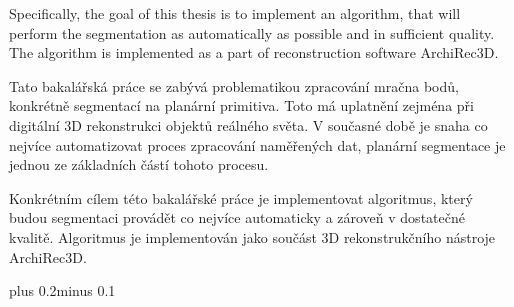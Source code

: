 \documentclass[11pt,twoside,a4paper]{book}
\begin{document}
Specifically, the goal of this thesis is to implement an algorithm, that will perform the segmentation as automatically as possible and in sufficient quality. The algorithm is implemented as a part of reconstruction software ArchiRec3D.


\baselineskip

\noindent
Tato bakalářská práce se zabývá problematikou zpracování mračna bodů, konkrétně segmentací na planární
primitiva. Toto má uplatnění zejména při digitální 3D rekonstrukci objektů reálného světa. V současné době je
snaha co nejvíce automatizovat proces zpracování naměřených dat, planární segmentace je jednou ze základních
částí tohoto procesu.

Konkrétním cílem této bakalářské práce je implementovat algoritmus, který budou segmentaci provádět co
nejvíce automaticky a zároveň v dostatečné kvalitě. Algoritmus je implementován jako součást 3D
rekonstrukčního nástroje ArchiRec3D.

\tableofcontents

\listoffigures

\listoftables


\mainbodystarts
\normalfont
{}\baselineskip plus 0.2\baselineskip minus 0.1\baselineskip



% 
% 
\end{document}
